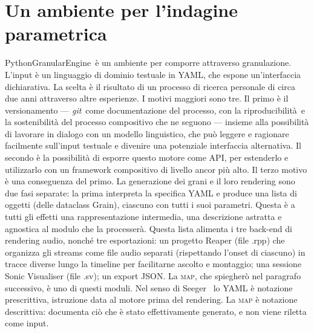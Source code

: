 \section{Un ambiente per l'indagine parametrica}\label{sec:architettura}
PythonGranularEngine\notaRepo\ è un ambiente per comporre attraverso
granulazione. L'input è un linguaggio di dominio
testuale in YAML, che espone un'interfaccia dichiarativa. La scelta è il
risultato di un processo di ricerca personale di circa due anni attraverso
altre esperienze\notaGamma.
I motivi maggiori sono tre. Il primo è il versionamento — \emph{git}\notaGit\ come documentazione del processo,
con la riproducibilità\notaSeed\ e la sostenibilità del processo compositivo che ne seguono — insieme alla possibilità di lavorare
in dialogo con un modello linguistico, che può leggere e ragionare facilmente sull'input testuale e divenire una potenziale
interfaccia alternativa. Il secondo è la possibilità di esporre questo motore come API, per estenderlo
e utilizzarlo con un framework compositivo di livello ancor più alto.
Il terzo motivo è una conseguenza del primo. La generazione dei grani e il loro rendering 
sono due fasi separate: la prima interpreta la specifica YAML e produce
una lista di oggetti (delle dataclass Grain), ciascuno con tutti i suoi parametri.
Questa è a tutti gli effetti una rappresentazione intermedia, una descrizione astratta
e agnostica al modulo che la processerà. Questa lista alimenta
i tre back-end di rendering audio\notaMotoriAudio, nonché tre
esportazioni: un progetto Reaper (file .rpp) che organizza gli streams come file audio separati
(rispettando l'onset di ciascuno)
in tracce diverse lungo la timeline per facilitarne ascolto e montaggio; una sessione Sonic Visualiser (file .sv); un export JSON. 
La \textsc{map}, che spiegherò nel paragrafo successivo, è uno di questi moduli.
Nel senso di Seeger~\cite{Seeger1958} lo YAML è notazione prescrittiva,
istruzione data al motore prima del rendering. La \textsc{map} è notazione
descrittiva: documenta ciò che è stato effettivamente generato, e non viene
riletta come input.



